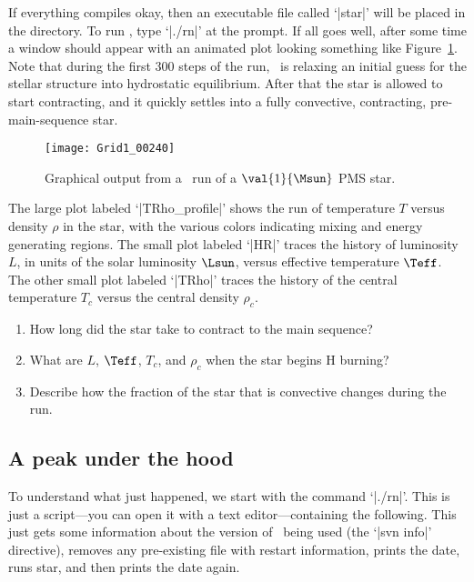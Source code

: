 \begin{mesaproject}
If everything compiles okay, then an executable file called `|star|' will be placed in the directory. To run \mesa, type `|./rn|' at the prompt.  If all goes well, after some time a window should appear with an animated plot looking something like Figure~\ref{f.mesa-fig}. Note that during the first 300 steps of the run, \mesa\ is relaxing an initial guess for the stellar structure into hydrostatic equilibrium. After that the star is allowed to start contracting, and it quickly settles into a fully convective, contracting, pre-main-sequence star.

\begin{figure}[htbp]
\centering\texttt{[image: Grid1\_00240]}
\caption{Graphical output from a \mesa\ run of a $\val{1}{\Msun}$ PMS star. \label{f.mesa-fig}}
\end{figure}

The large plot labeled `|TRho_profile|' shows the run of temperature $T$ versus density $\rho$ in the star, with the various colors indicating mixing and energy generating regions. The small plot labeled `|HR|' traces the history of luminosity $L$, in units of the solar luminosity $\Lsun$, versus effective temperature $\Teff$. The other small plot labeled `|TRho|' traces the history of the central temperature $T_{c}$ versus the central density $\rho_{c}$.

\begin{exercisebox}
\begin{enumerate}
\item How long did the star take to contract to the main sequence?
\item What are $L$, $\Teff$, $T_{c}$, and $\rho_{c}$ when the star begins H burning?
\item Describe how the fraction of the star that is convective changes during the run.
\end{enumerate}
\end{exercisebox}

\subsection{A peak under the hood}
To understand what just happened, we start with the command `|./rn|'. This is just a script---you can open it with a text editor---containing the following.
This just gets some information about the version of \mesa\ being used (the `|svn info|' directive), removes any pre-existing file with restart information, prints the date, runs star, and then prints the date again.


\end{mesaproject}
